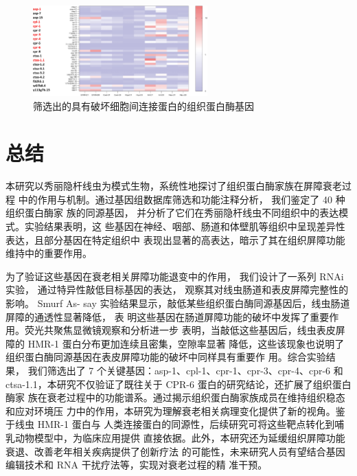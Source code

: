 \begin{figure}[H]
    \centering
    \includegraphics[width=0.6\textwidth]{img/heatmap2.png}
    \caption{筛选出的具有破坏细胞间连接蛋白的组织蛋白酶基因}
    \label{fig:heatmap2}
\end{figure}

\section{总结}

本研究以秀丽隐杆线虫为模式生物，系统性地探讨了组织蛋白酶家族在屏障衰老过程 中的作用与机制。通过基因组数据库筛选和功能注释分析， 我们鉴定了 40 种组织蛋白酶家 族的同源基因， 并分析了它们在秀丽隐杆线虫不同组织中的表达模式。实验结果表明，这 些基因在神经、咽部、肠道和体壁肌等组织中呈现差异性表达，且部分基因在特定组织中 表现出显著的高表达，暗示了其在组织屏障功能维持中的重要作用。

为了验证这些基因在衰老相关屏障功能退变中的作用， 我们设计了一系列 RNAi 实验， 通过特异性敲低目标基因的表达， 观察其对线虫肠道和表皮屏障完整性的影响。 Smurf As-    say 实验结果显示，敲低某些组织蛋白酶同源基因后，线虫肠道屏障的通透性显著降低， 表  明这些基因在肠道屏障功能的破坏中发挥了重要作用。荧光共聚焦显微镜观察和分析进一步 表明，当敲低这些基因后，线虫表皮屏障的 HMR-1 蛋白分布更加连续且密集，空隙率显著 降低，这些该现象也说明了组织蛋白酶同源基因在表皮屏障功能的破坏中同样具有重要作  用。综合实验结果， 我们筛选出了 7 个关键基因：asp-1、cpl-1、cpr-1、cpr-3、cpr-4、cpr-6    和 ctsa-1.1，本研究不仅验证了既往关于 CPR-6 蛋白的研究结论，还扩展了组织蛋白酶家  族在衰老过程中的功能谱系。通过揭示组织蛋白酶家族成员在维持组织稳态和应对环境压  力中的作用，本研究为理解衰老相关病理变化提供了新的视角。鉴于线虫 HMR-1 蛋白与  人类连接蛋白的同源性，后续研究可将这些靶点转化到哺乳动物模型中，为临床应用提供  直接依据。此外，本研究还为延缓组织屏障功能衰退、改善老年相关疾病提供了创新疗法  的可能性，未来研究人员有望结合基因编辑技术和 RNA 干扰疗法等，实现对衰老过程的精  准干预。
